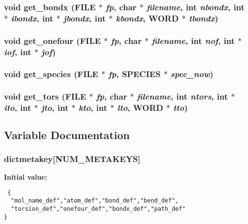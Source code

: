\subsubsection{\setlength{\rightskip}{0pt plus 5cm}void get\_\-bondx (FILE $\ast$ {\em fp}, char $\ast$ {\em filename}, int {\em nbondx}, int $\ast$ {\em ibondx}, int $\ast$ {\em jbondx}, int $\ast$ {\em kbondx}, {\bf WORD} $\ast$ {\em tbondx})}\label{md__getmols_8c_c7022b5da2df3cb8c7dbc7cfd2cca1db}


\subsubsection{\setlength{\rightskip}{0pt plus 5cm}void get\_\-onefour (FILE $\ast$ {\em fp}, char $\ast$ {\em filename}, int {\em nof}, int $\ast$ {\em iof}, int $\ast$ {\em jof})}\label{md__getmols_8c_aa5b13537d1600fb33ebed9ec61adb52}


\subsubsection{\setlength{\rightskip}{0pt plus 5cm}void get\_\-species (FILE $\ast$ {\em fp}, {\bf SPECIES} $\ast$ {\em spec\_\-now})}\label{md__getmols_8c_58ffeae044dc7a10714093ca3f71b8a8}


\subsubsection{\setlength{\rightskip}{0pt plus 5cm}void get\_\-tors (FILE $\ast$ {\em fp}, char $\ast$ {\em filename}, int {\em ntors}, int $\ast$ {\em ito}, int $\ast$ {\em jto}, int $\ast$ {\em kto}, int $\ast$ {\em lto}, {\bf WORD} $\ast$ {\em tto})}\label{md__getmols_8c_bc94442cdbaa8ae36bfb74ce6ba34857}




\subsection{Variable Documentation}
\subsubsection{ {\bf dictmetakey}[NUM\_\-METAKEYS]}\label{md__getmols_8c_9755b748bc1e53c1ee610828341d9c57}


{\bf Initial value:}

\footnotesize\begin{verbatim} {
  "mol_name_def","atom_def","bond_def","bend_def",
  "torsion_def","onefour_def","bondx_def","path_def"
}
\end{verbatim}\normalsize 
